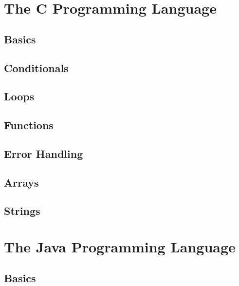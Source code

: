 \documentclass[12pt]{scrbook}
\begin{document}



\part{The C Programming Language}

\chapter{Basics}


\chapter{Conditionals}


\chapter{Loops}


\chapter{Functions}
\label{chapter:c:functions}


\chapter{Error Handling}
\label{chapter:c:errorHandling}


\chapter{Arrays}
\label{chapter:c:arrays}


\chapter{Strings}
\label{chapter:c:strings}


\part{The Java Programming Language}

\chapter{Basics}

\end{document}

